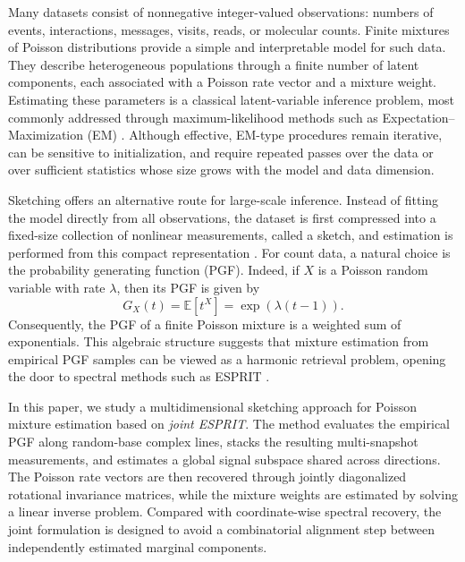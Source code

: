 \documentclass[sigconf,natbib=true,anonymous=true,review=true]{acmart}
\begin{document}
Many datasets consist of nonnegative integer-valued observations: numbers of events, interactions, messages, visits, reads, or molecular counts. 
Finite mixtures of Poisson distributions provide a simple and interpretable model for such data.
They describe heterogeneous populations through a finite number of latent components, each associated with a Poisson rate vector and a mixture weight.
Estimating these parameters is a classical latent-variable inference problem, most commonly addressed through maximum-likelihood methods such as Expectation--Maximization (EM) \cite{dempster1977em,karlis2005em}.
Although effective, EM-type procedures remain iterative, can be sensitive to initialization, and require repeated passes over the data or over sufficient statistics whose size grows with the model and data dimension.

Sketching offers an alternative route for large-scale inference. 
Instead of fitting the model directly from all observations, the dataset is first compressed into a fixed-size collection of nonlinear measurements, called a sketch, and estimation is performed from this compact representation \cite{cormode2017sketching,keriven2021sketching}. 
For count data, a natural choice is the probability generating function (PGF). 
Indeed, if $X$ is a Poisson random variable with rate $\lambda$, then its PGF is given by
\[
    G_X(t) = \mathbb{E}[t^X] = \exp(\lambda(t-1)).
\]
Consequently, the PGF of a finite Poisson mixture is a weighted sum of exponentials.
This algebraic structure suggests that mixture estimation from empirical PGF samples can be viewed as a harmonic retrieval problem, opening the door to spectral methods such as ESPRIT \cite{roy1989esprit}.

In this paper, we study a multidimensional sketching approach for Poisson mixture estimation based on \emph{joint ESPRIT}. 
The method evaluates the empirical PGF along random-base complex lines, stacks the resulting multi-snapshot measurements, and estimates a global signal subspace shared across directions.
The Poisson rate vectors are then recovered through jointly diagonalized rotational invariance matrices, while the mixture weights are estimated by solving a linear inverse problem. 
Compared with coordinate-wise spectral recovery, the joint formulation is designed to avoid a combinatorial alignment step between independently estimated marginal components.
\end{document}
